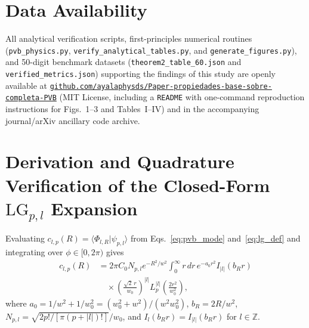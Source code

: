 \documentclass[aps,pra,reprint,nofootinbib,floatfix,longbibliography]{revtex4-2}
\theoremstyle{remark}
\newcommand{\braket}[2]{\langle #1 | #2 \rangle}
\newcommand{\abs}[1]{\lvert #1 \rvert}
\begin{document}
\section*{Data Availability}
{\sloppy All analytical verification scripts, first-principles numerical routines (\texttt{pvb\_\allowbreak physics.py}, \texttt{verify\_\allowbreak analytical\_\allowbreak tables.py}, and \texttt{generate\_\allowbreak figures.py}), and 50-digit benchmark datasets (\texttt{theorem2\_\allowbreak table\_\allowbreak 60.json} and \texttt{verified\_\allowbreak metrics.json}) supporting the findings of this study are openly available at \href{https://github.com/ayalaphysds/Paper-propiedades-base-sobre-completa-PVB}{\texttt{github.com/\allowbreak ayalaphysds/\allowbreak Paper-\allowbreak propiedades-\allowbreak base-\allowbreak sobre-\allowbreak completa-\allowbreak PVB}} (MIT License, including a \texttt{README} with one-command reproduction instructions for Figs.~1--3 and Tables~I--IV) and in the accompanying journal/arXiv ancillary code archive.\par}

\appendix

\section{Derivation and Quadrature Verification of the Closed-Form \texorpdfstring{$\mathrm{LG}_{p,l}$}{LG\_\{p,l\}} Expansion}
\label{app:lg_expansion}

Evaluating $c_{l,p}(R) = \braket{\Phi_{l,R}}{\psi_{p,l}}$ from Eqs.~\eqref{eq:pvb_mode} and~\eqref{eq:lg_def} and integrating over $\phi \in [0,2\pi)$ gives
\begin{align}
c_{l,p}(R) &= 2\pi C_0 N_{p,l} e^{-R^2/w^2} \int_0^\infty r\,dr\, e^{-a_0 r^2} I_{\abs{l}}(b_R r) \nonumber \\
&\quad \times \left(\frac{\sqrt{2}\,r}{w_0}\right)^{\abs{l}} L_p^{\abs{l}}\!\left(\frac{2r^2}{w_0^2}\right),
\label{eq:app_c_int}
\end{align}
where $a_0 = 1/w^2 + 1/w_0^2 = (w_0^2+w^2)/(w^2 w_0^2)$, $b_R = 2R/w^2$, $N_{p,l} = \sqrt{2p!/[\pi(p+\abs{l})!]}/w_0$, and $I_l(b_R r) = I_{\abs{l}}(b_R r)$ for $l \in \mathbb{Z}$.
\end{document}
